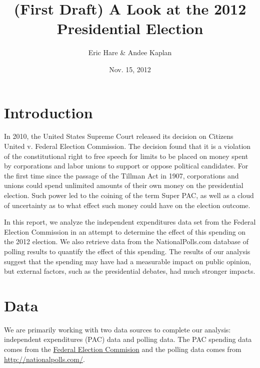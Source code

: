 \documentclass[11pt]{article}\usepackage{graphicx, color}
\begin{document}
\setlength{\parskip}{3ex}
\setlength{\parindent}{0pt}

\title{(First Draft) A Look at the 2012 Presidential Election}
\author{Eric Hare \& Andee Kaplan}
\date{Nov. 15, 2012}

\maketitle

\section{Introduction}
In 2010, the United States Supreme Court released its decision on Citizens United v. Federal Election Commission. The decision found that it is a violation of the constitutional right to free speech for limits to be placed on money spent by corporations and labor unions to support or oppose political candidates. For the first time since the passage of the Tillman Act in 1907, corporations and unions could spend unlimited amounts of their own money on the presidential election. Such power led to the coining of the term Super PAC, as well as a cloud of uncertainty as to what effect such money could have on the election outcome.

In this report, we analyze the independent expenditures data set from the Federal Election Commission in an attempt to determine the effect of this spending on the 2012 election. We also retrieve data from the NationalPolls.com database of polling results to quantify the effect of this spending. The results of our analysis suggest that the spending may have had a measurable impact on public opinion, but external factors, such as the presidential debates, had much stronger impacts.






\section{Data}
We are primarily working with two data sources to complete our analysis: independent expenditures (PAC) data and polling data. The PAC spending data comes from the \href{http://www.fec.gov/data/IndependentExpenditure.do?format=html&cf=superPAC}{Federal Election Commision} and the polling data comes from \url{http://nationalpolls.com/}. 
\end{document}
